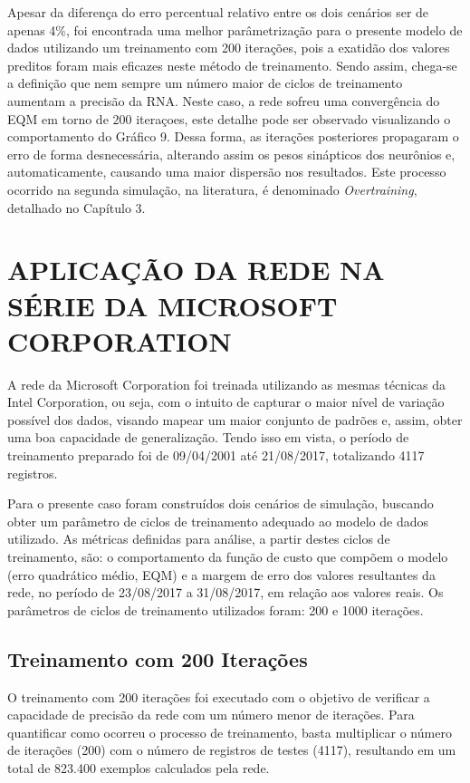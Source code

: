 Apesar da diferença do erro percentual relativo entre os dois cenários ser de apenas 4\%, foi encontrada uma melhor parâmetrização para o presente modelo de dados utilizando um treinamento com 200 iterações, pois a exatidão dos valores preditos foram mais eficazes neste método de treinamento. Sendo assim, chega-se a definição que nem sempre um número maior de ciclos de treinamento aumentam a precisão da RNA. Neste caso, a rede sofreu uma convergência do EQM em torno de 200 iteraçoes, este detalhe pode ser observado visualizando o comportamento do Gráfico 9. Dessa forma, as iterações posteriores propagaram o erro de forma desnecessária, alterando assim os pesos sinápticos dos neurônios e, automaticamente, causando uma maior dispersão nos resultados. Este processo ocorrido na segunda simulação, na literatura, é denominado \textit{Overtraining}, detalhado no Capítulo 3.

\section{APLICAÇÃO DA REDE NA SÉRIE DA MICROSOFT CORPORATION}
A rede da Microsoft Corporation foi treinada utilizando as mesmas técnicas da Intel Corporation, ou seja, com o intuito de capturar o maior nível de variação possível dos dados, visando mapear um maior conjunto de padrões e, assim, obter uma boa capacidade de generalização. Tendo isso em vista, o período de treinamento preparado foi de 09/04/2001 até 21/08/2017, totalizando 4117 registros.

Para o presente caso foram construídos dois cenários de simulação, buscando obter um parâmetro de ciclos de treinamento adequado ao modelo de dados utilizado. As métricas definidas para análise, a partir destes ciclos de treinamento, são: o comportamento da função de custo que compõem o modelo (erro quadrático médio, EQM) e a margem de erro dos valores resultantes da rede, no período de 23/08/2017 a 31/08/2017, em relação aos valores reais. Os parâmetros de ciclos de treinamento utilizados foram: 200 e 1000 iterações.

\subsection{Treinamento com 200 Iterações}	
O treinamento com 200 iterações foi executado com o objetivo de verificar a capacidade de precisão da rede com um número menor de iterações. Para quantificar como ocorreu o processo de treinamento, basta multiplicar o número de iterações (200) com o número de registros de testes (4117), resultando em um total de 823.400 exemplos calculados pela rede.

